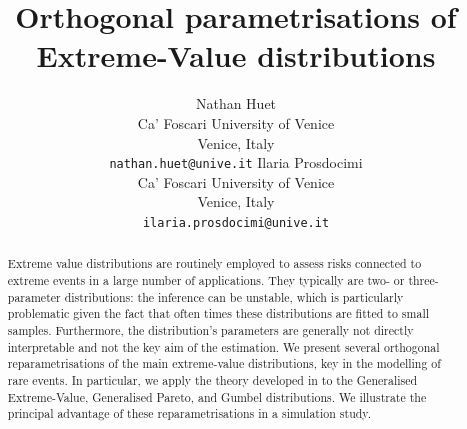 \documentclass{article}
\title{Orthogonal parametrisations of Extreme-Value distributions}
\author{
Nathan Huet \\
  Ca’ Foscari University of Venice\\
  Venice, Italy \\
  \texttt{nathan.huet@unive.it}
   \And
 Ilaria Prosdocimi \\
  Ca’ Foscari University of Venice\\
  Venice, Italy \\
  \texttt{ilaria.prosdocimi@unive.it}
}
\newcommand{\1}{\mathds{1}}
\theoremstyle{definition}
\begin{document}
\maketitle
\begin{abstract}
Extreme value distributions 
are routinely employed to assess risks connected to extreme events in a large number of applications. 
They typically are two- or three- parameter distributions: the inference can be unstable, which is particularly problematic given the fact that often times these distributions are fitted to small samples. 
Furthermore, the distribution's parameters are generally not directly interpretable and not the key aim of the estimation. 
We present several orthogonal reparametrisations of the main extreme-value distributions, key in the modelling of rare events. In particular, we apply the theory developed in \cite{cox1987parameter} to the Generalised Extreme-Value, Generalised Pareto, and Gumbel distributions. 
We illustrate the principal advantage of these reparametrisations in a simulation study.

\end{abstract}







\end{document}
